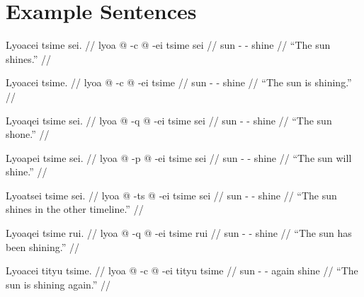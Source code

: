 \documentclass{article}
\begin{document}







\newpage

\part{Example Sentences}

\ex[lingstyle=QuCheanya] \begingl
\glpreamble Lyoacei tsime sei. //
\gla lyoa @ -c @ -ei tsime sei //
\glb sun - - shine  //
\glft ``The sun shines.'' //
\endgl \xe

\ex[lingstyle=QuCheanya] \begingl
\glpreamble Lyoacei tsime. //
\gla lyoa @ -c @ -ei tsime //
\glb sun - - shine //
\glft ``The sun is shining.'' //
\endgl \xe

\ex[lingstyle=QuCheanya] \begingl
\glpreamble Lyoaqei tsime sei. //
\gla lyoa @ -q @ -ei tsime sei  //
\glb sun - - shine  //
\glft ``The sun shone.'' //
\endgl \xe

\ex[lingstyle=QuCheanya] \begingl
\glpreamble Lyoapei tsime sei. //
\gla lyoa @ -p @ -ei tsime sei //
\glb sun - - shine  //
\glft ``The sun will shine.'' //
\endgl \xe

\ex[lingstyle=QuCheanya] \begingl
\glpreamble Lyoatsei tsime sei. //
\gla lyoa @ -ts @ -ei tsime sei //
\glb sun - - shine  //
\glft ``The sun shines in the other timeline.'' //
\endgl \xe

\ex[lingstyle=QuCheanya] \begingl
\glpreamble Lyoaqei tsime rui. //
\gla lyoa @ -q @ -ei tsime rui //
\glb sun - - shine  //
\glft ``The sun has been shining.'' //
\endgl \xe

\ex[lingstyle=QuCheanya] \begingl
\glpreamble Lyoacei tityu tsime. //
\gla lyoa @ -c @ -ei tityu tsime //
\glb sun - - again shine //
\glft ``The sun is shining again.'' //
\endgl \xe
\end{document}

